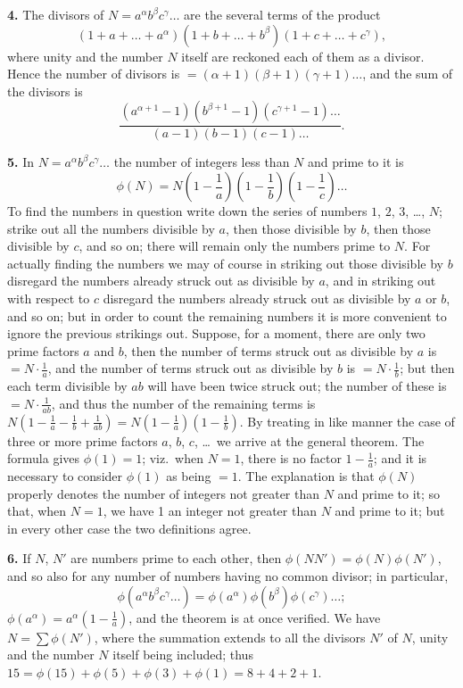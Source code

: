 \documentclass[11pt,a4paper]{book}
\begin{document}
\textbf{4.}\quad
The divisors of $N = a^{\alpha} b^{\beta} c^{\gamma} \ldots$ are the several terms of the product
\[
(1 + a + \ldots + a^{\alpha})(1 + b + \ldots + b^{\beta})(1 + c + \ldots + c^{\gamma}),
\]
where unity and the number $N$ itself are reckoned each of them as a divisor. Hence the number of divisors is $= (\alpha + 1)(\beta + 1)(\gamma + 1) \ldots$, and the sum of the divisors is
\[
\frac{(a^{\alpha+1} - 1)(b^{\beta+1} - 1)(c^{\gamma+1} - 1) \ldots}{(a - 1)(b - 1)(c - 1) \ldots}.
\]

\textbf{5.}\quad
In $N = a^{\alpha} b^{\beta} c^{\gamma} \ldots$ the number of integers less than $N$ and prime to it is
\[
\phi(N) = N\left(1 - \frac{1}{a}\right)\left(1 - \frac{1}{b}\right)\left(1 - \frac{1}{c}\right) \ldots
\]
To find the numbers in question write down the series of numbers $1$, $2$, $3$, \ldots, $N$; strike out all the numbers divisible by $a$, then those divisible by $b$, then those divisible by $c$, and so on; there will remain only the numbers prime to $N$. For actually finding the numbers we may of course in striking out those divisible by $b$ disregard the numbers already struck out as divisible by $a$, and in striking out with respect to $c$ disregard the numbers already struck out as divisible by $a$ or $b$, and so on; but in order to count the remaining numbers it is more convenient to ignore the previous strikings out. Suppose, for a moment, there are only two prime factors $a$ and $b$, then the number of terms struck out as divisible by $a$ is $= N \cdot \frac{1}{a}$, and the number of terms struck out as divisible by $b$ is $= N \cdot \frac{1}{b}$; but then each term divisible by $ab$ will have been twice struck out; the number of these is $= N \cdot \frac{1}{ab}$, and thus the number of the remaining terms is $N(1 - \frac{1}{a} - \frac{1}{b} + \frac{1}{ab}) = N(1 - \frac{1}{a})(1 - \frac{1}{b})$. By treating in like manner the case of three or more prime factors $a$, $b$, $c$, \ldots\ we arrive at the general theorem. The formula gives $\phi(1) = 1$; viz.\ when $N = 1$, there is no factor $1 - \frac{1}{a}$; and it is necessary to consider $\phi(1)$ as being $= 1$. The explanation is that $\phi(N)$ properly denotes the number of integers not greater than $N$ and prime to it; so that, when $N = 1$, we have 1 an integer not greater than $N$ and prime to it; but in every other case the two definitions agree.

\textbf{6.}\quad
If $N$, $N'$ are numbers prime to each other, then $\phi(NN') = \phi(N)\phi(N')$, and so also for any number of numbers having no common divisor; in particular,
\[
\phi(a^{\alpha} b^{\beta} c^{\gamma} \ldots) = \phi(a^{\alpha})\phi(b^{\beta})\phi(c^{\gamma}) \ldots;
\]
$\phi(a^{\alpha}) = a^{\alpha}(1 - \frac{1}{a})$, and the theorem is at once verified. We have $N = \sum \phi(N')$, where the summation extends to all the divisors $N'$ of $N$, unity and the number $N$ itself being included; thus $15 = \phi(15) + \phi(5) + \phi(3) + \phi(1) = 8 + 4 + 2 + 1$.
\end{document}

